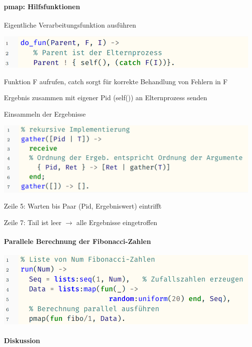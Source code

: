 \documentclass[10pt]{article}
\begin{document}
\paragraph{pmap: Hilfsfunktionen}

\color{orange} Eigentliche Verarbeitungsfunktion ausführen \color{black}
\begin{center}
  \includegraphics[width=0.4\linewidth]{Assets/Programmierparadigmen-code-snippet-05}
\end{center}
\begin{itemize*}
  \item Funktion F aufrufen, catch sorgt für korrekte Behandlung von Fehlern in F
  \item Ergebnis zusammen mit eigener Pid (self()) an Elternprozess senden
\end{itemize*}

\color{orange} Einsammeln der Ergebnisse \color{black}
\begin{center}
  \includegraphics[width=0.4\linewidth]{Assets/Programmierparadigmen-code-snippet-06}
\end{center}
\begin{itemize*}
  \item Zeile 5: Warten bis Paar (Pid, Ergebniswert) eintrifft
  \item Zeile 7: Tail ist leer $\rightarrow$ alle Ergebnisse eingetroffen
\end{itemize*}

\paragraph{Parallele Berechnung der Fibonacci-Zahlen}

\begin{center}
  \includegraphics[width=0.4\linewidth]{Assets/Programmierparadigmen-code-snippet-07}
\end{center}

\paragraph{Diskussion}
\end{document}

